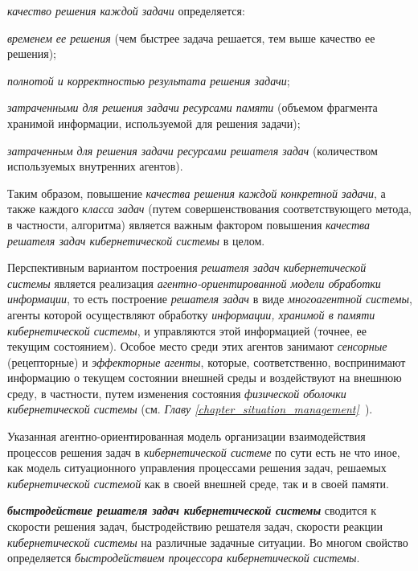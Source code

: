 \textit{качество решения каждой задачи} определяется:
\begin{textitemize}
    \item \textit{временем ее решения} (чем быстрее задача решается, тем выше качество ее решения);
    \item \textit{полнотой и корректностью результата решения задачи};
    \item \textit{затраченными для решения задачи ресурсами памяти} (объемом фрагмента хранимой информации, используемой для решения задачи);
    \item \textit{затраченным для решения задачи ресурсами решателя задач} (количеством используемых внутренних агентов).
\end{textitemize}

Таким образом, повышение \textit{качества решения каждой конкретной задачи}, а также каждого \textit{класса задач} (путем совершенствования соответствующего метода, в частности, алгоритма) является важным фактором повышения \textit{качества решателя задач кибернетической системы} в целом.

Перспективным вариантом построения \textit{решателя задач} \textit{кибернетической системы} является реализация \textit{агентно-ориентированной модели обработки информации}, то есть построение \textit{решателя задач} в виде \textit{многоагентной системы}, агенты которой осуществляют обработку \textit{информации, хранимой в памяти кибернетической системы}, и управляются этой информацией (точнее, ее текущим состоянием). 
Особое место среди этих агентов занимают \textit{сенсорные} (рецепторные) и \textit{эффекторные агенты}, которые, соответственно, воспринимают информацию о текущем состоянии внешней среды и воздействуют на внешнюю среду, в частности, путем изменения состояния \textit{физической оболочки кибернетической системы} (см. \textit{Главу \ref{chapter_situation_management}~}).

Указанная агентно-ориентированная модель организации взаимодействия процессов решения задач в \textit{кибернетической системе} по сути есть не что иное, как модель ситуационного управления процессами решения задач, решаемых \textit{кибернетической системой} как в своей внешней среде, так и в своей памяти.

\textbf{\textit{быстродействие решателя задач кибернетической системы}} сводится к скорости решения задач, быстродействию решателя задач, скорости реакции \textit{кибернетической системы} на различные задачные ситуации. Во многом свойство определяется \textit{быстродействием процессора кибернетической системы}.

